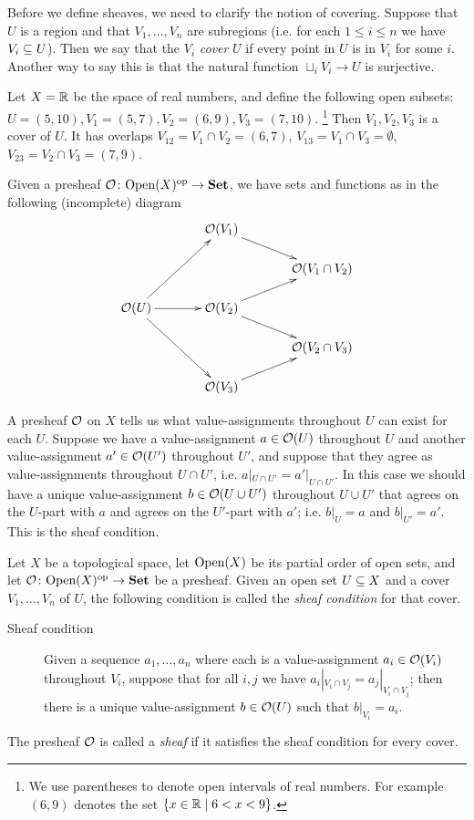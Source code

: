 \documentclass[CT4S-EN-RU]{subfiles}
\begin{document}
Before we define sheaves, we need to clarify the notion of covering. Suppose that $U$ is a region and that $V_1,\ldots,V_n$ are subregions (i.e. for each $1\leq i\leq n$ we have $V_i\ss U$). Then we say that the $V_i$ {\em cover} $U$ if every point in $U$ is in $V_i$ for some $i$. Another way to say this is that the natural function $\sqcup_iV_i\to U$ is surjective.

\begin{example}\label{ex:open cover}

Let $X=\RR$ be the space of real numbers, and define the following open subsets: $U=(5,10), V_1=(5,7), V_2=(6,9), V_3=(7,10)$.
\footnote{We use parentheses to denote open intervals of real numbers. For example $(6,9)$ denotes the set $\{x\in\RR\|6<x<9\}$.} 
Then $V_1, V_2, V_3$ is a cover of $U$. It has overlaps $V_{12}=V_1\cap V_2=(6,7)$, $V_{13}=V_1\cap V_3=\emptyset$, $V_{23}=V_2\cap V_3=(7,9)$. 

Given a presheaf $\mcO\taking\Op(X)\op\to\Set$, we have sets and functions as in the following (incomplete) diagram
$$
\xymatrix@=15pt{
&&\mcO(V_1)\ar[drr]\\
&&&&\mcO(V_1\cap V_2)\\
\mcO(U)\ar[uurr]\ar[rr]\ar[ddrr]&&\mcO(V_2)\ar[urr]\ar[drr]\\
&&&&\mcO(V_2\cap V_3)\\
&&\mcO(V_3)\ar[urr]
}
$$

\end{example}

A presheaf $\mcO$ on $X$ tells us what value-assignments throughout $U$ can exist for each $U$. Suppose we have a value-assignment $a\in\mcO(U)$ throughout $U$ and another value-assignment $a'\in\mcO(U')$ throughout $U'$, and suppose that they agree as value-assignments throughout $U\cap U'$, i.e. $a|_{U\cap U'}=a'|_{U\cap U'}$. In this case we should have a unique value-assignment $b\in\mcO(U\cup U')$ throughout $U\cup U'$ that agrees on the $U$-part with $a$ and agrees on the $U'$-part with $a'$; i.e. $b|_U=a$ and $b|_{U'}=a'$. This is the sheaf condition. 

\begin{definition}\label{def:sheaf}

Let $X$ be a topological space, let $\Op(X)$ be its partial order of open sets, and let $\mcO\taking\Op(X)\op\to\Set$ be a presheaf. Given an open set $U\ss X$ and a cover $V_1,\ldots, V_n$ of $U$, the following condition is called the {\em sheaf condition} for that cover. 
\begin{description}
\item [Sheaf condition] Given a sequence $a_1,\ldots,a_n$ where each is a value-assignment $a_i\in\mcO(V_i)$ throughout $V_i$, suppose that for all $i,j$ we have $a_i|_{V_i\cap V_j}=a_j|_{V_i\cap V_j}$; then there is a unique value-assignment $b\in\mcO(U)$ such that $b|_{V_i}=a_i$.
\end{description}
The presheaf $\mcO$ is called a {\em sheaf} if it satisfies the sheaf condition for every cover.

\end{definition}
\end{document}
